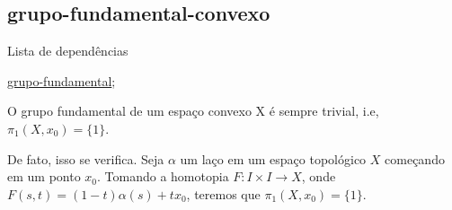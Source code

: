 \subsection{grupo-fundamental-convexo}
\label{grupo-fundamental-convexo}
\begin{titlemize}{Lista de dependências}
	\item \hyperref[grupo-fundamental-def]{grupo-fundamental};\\ %
\end{titlemize}

\begin{ex}
O grupo fundamental de um espaço convexo X é sempre trivial, i.e, $\pi_1(X, x_0) = \{ 1\}$.
\end{ex}

De fato, isso se verifica. Seja $\alpha$ um laço em um espaço topológico $X$ começando em um ponto $x_0$.
Tomando a homotopia $F:I \times I \longrightarrow X$, onde $F(s,t) = (1 - t)\alpha(s) + tx_0$, teremos que $\pi_1(X, x_0) = \{1\}$.


